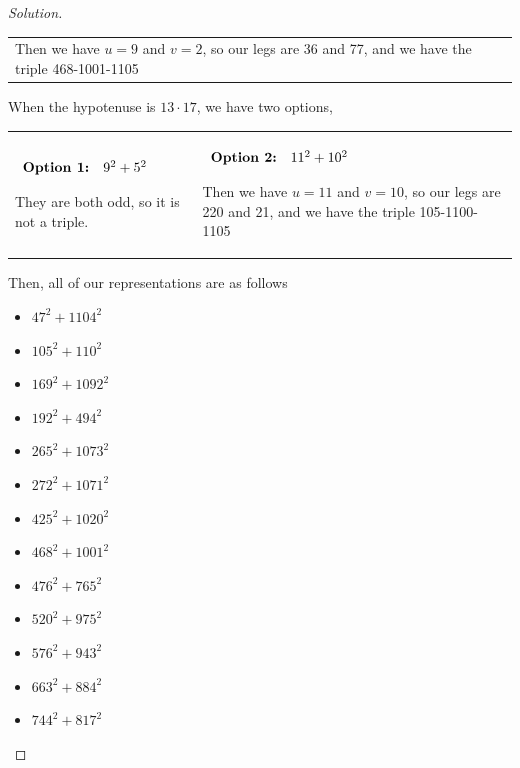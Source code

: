 \documentclass[11pt]{article}
\newenvironment{solution}
  {\renewcommand\qedsymbol{$~$}\begin{proof}[Solution]$ $\par\nobreak\ignorespaces}
  {\end{proof}}
\begin{document}
\begin{solution}
\begin{center}
\begin{NiceTabular}[width=0.95\textwidth]{X[l] !{\qquad} X[l]}
      Then we have $u=9$ and $v=2$, so our legs are 36 and 77, and we have the triple 468-1001-1105
      \\
    \end{NiceTabular}
  \end{center}

  When the hypotenuse is $13\cdot 17$, we have two options,
  \begin{center}
    \begin{NiceTabular}[width=0.95\textwidth]{X[l] !{\qquad} X[l]}
      \begin{math}
        \begin{array}[t]{rl}
          \textbf{Option 1:} & 9^2+5^2 \\
        \end{array}
      \end{math}

      They are both odd, so it is not a triple.


       &
      \begin{math}
        \begin{array}[t]{rl}
          \textbf{Option 2:} & 11^2+10^2
        \end{array}
      \end{math}

      Then we have $u=11$ and $v=10$, so our legs are 220 and 21, and we have the triple 105-1100-1105
      \\
    \end{NiceTabular}
  \end{center}

  Then, all of our representations are as follows
  \begin{multicols}{5}
    \begin{itemize}
      \item $47^2+1104^2$
      \item $105^2+110^2$
      \item $169^2+1092^2$
      \item $192^2+494^2$
      \item $265^2+1073^2$
      \item $272^2+1071^2$
      \item $425^2+1020^2$
      \item $468^2+1001^2$
      \item $476^2+765^2$
      \item $520^2+975^2$
      \item $576^2+943^2$
      \item $663^2+884^2$
      \item $744^2+817^2$
    \end{itemize}
  \end{multicols}

\end{solution}
\end{document}
